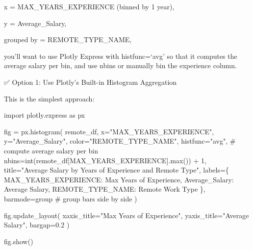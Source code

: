 \documentclass[
  letterpaper,
  DIV=11,
  numbers=noendperiod]{scrartcl}
\newenvironment{Shaded}{\begin{snugshade}}{\end{snugshade}}
\newcommand{\BuiltInTok}[1]{\textcolor[rgb]{0.00,0.23,0.31}{#1}}
\newcommand{\CommentTok}[1]{\textcolor[rgb]{0.37,0.37,0.37}{#1}}
\newcommand{\DecValTok}[1]{\textcolor[rgb]{0.68,0.00,0.00}{#1}}
\newcommand{\FloatTok}[1]{\textcolor[rgb]{0.68,0.00,0.00}{#1}}
\newcommand{\ImportTok}[1]{\textcolor[rgb]{0.00,0.46,0.62}{#1}}
\newcommand{\NormalTok}[1]{\textcolor[rgb]{0.00,0.23,0.31}{#1}}
\newcommand{\OperatorTok}[1]{\textcolor[rgb]{0.37,0.37,0.37}{#1}}
\newcommand{\StringTok}[1]{\textcolor[rgb]{0.13,0.47,0.30}{#1}}
\begin{document}
x = MAX\_YEARS\_EXPERIENCE (binned by 1 year),

y = Average\_Salary,

grouped by = REMOTE\_TYPE\_NAME,

you'll want to use Plotly Express with histfunc=`avg' so that it
computes the average salary per bin, and use nbins or manually bin the
experience column.

✅ Option 1: Use Plotly's Built-in Histogram Aggregation

This is the simplest approach:

\begin{Shaded}
\begin{Highlighting}[]
\ImportTok{import}\NormalTok{ plotly.express }\ImportTok{as}\NormalTok{ px}

\NormalTok{fig }\OperatorTok{=}\NormalTok{ px.histogram(}
\NormalTok{    remote\_df,}
\NormalTok{    x}\OperatorTok{=}\StringTok{"MAX\_YEARS\_EXPERIENCE"}\NormalTok{,}
\NormalTok{    y}\OperatorTok{=}\StringTok{"Average\_Salary"}\NormalTok{,}
\NormalTok{    color}\OperatorTok{=}\StringTok{"REMOTE\_TYPE\_NAME"}\NormalTok{,}
\NormalTok{    histfunc}\OperatorTok{=}\StringTok{"avg"}\NormalTok{,               }\CommentTok{\# compute average salary per bin}
\NormalTok{    nbins}\OperatorTok{=}\BuiltInTok{int}\NormalTok{(remote\_df[}\StringTok{\textquotesingle{}MAX\_YEARS\_EXPERIENCE\textquotesingle{}}\NormalTok{].}\BuiltInTok{max}\NormalTok{()) }\OperatorTok{+} \DecValTok{1}\NormalTok{,}
\NormalTok{    title}\OperatorTok{=}\StringTok{"Average Salary by Years of Experience and Remote Type"}\NormalTok{,}
\NormalTok{    labels}\OperatorTok{=}\NormalTok{\{}
        \StringTok{\textquotesingle{}MAX\_YEARS\_EXPERIENCE\textquotesingle{}}\NormalTok{: }\StringTok{\textquotesingle{}Max Years of Experience\textquotesingle{}}\NormalTok{,}
        \StringTok{\textquotesingle{}Average\_Salary\textquotesingle{}}\NormalTok{: }\StringTok{\textquotesingle{}Average Salary\textquotesingle{}}\NormalTok{,}
        \StringTok{\textquotesingle{}REMOTE\_TYPE\_NAME\textquotesingle{}}\NormalTok{: }\StringTok{\textquotesingle{}Remote Work Type\textquotesingle{}}
\NormalTok{    \},}
\NormalTok{    barmode}\OperatorTok{=}\StringTok{\textquotesingle{}group\textquotesingle{}}  \CommentTok{\# group bars side by side}
\NormalTok{)}

\NormalTok{fig.update\_layout(}
\NormalTok{    xaxis\_title}\OperatorTok{=}\StringTok{"Max Years of Experience"}\NormalTok{,}
\NormalTok{    yaxis\_title}\OperatorTok{=}\StringTok{"Average Salary"}\NormalTok{,}
\NormalTok{    bargap}\OperatorTok{=}\FloatTok{0.2}
\NormalTok{)}

\NormalTok{fig.show()}
\end{Highlighting}
\end{Shaded}
\end{document}
